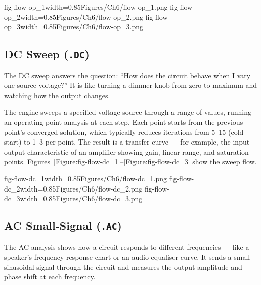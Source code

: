   {fig-flow-op_1}{width=0.85\textwidth}{Figures/Ch6/flow-op_1.png}
  {fig-flow-op_2}{width=0.85\textwidth}{Figures/Ch6/flow-op_2.png}
  {fig-flow-op_3}{width=0.85\textwidth}{Figures/Ch6/flow-op_3.png}

\subsection{DC Sweep (\texttt{.DC})}

The DC sweep answers the question: ``How does the circuit behave when I vary one source voltage?'' It is like turning a dimmer knob from zero to maximum and watching how the output changes.

The engine sweeps a specified voltage source through a range of values, running an operating-point analysis at each step. Each point starts from the previous point's converged solution, which typically reduces iterations from 5--15 (cold start) to 1--3 per point. The result is a transfer curve --- for example, the input-output characteristic of an amplifier showing gain, linear range, and saturation points. Figures~\ref{Figure:fig-flow-dc_1}--\ref{Figure:fig-flow-dc_3} show the sweep flow.

  {fig-flow-dc_1}{width=0.85\textwidth}{Figures/Ch6/flow-dc_1.png}
  {fig-flow-dc_2}{width=0.85\textwidth}{Figures/Ch6/flow-dc_2.png}
  {fig-flow-dc_3}{width=0.85\textwidth}{Figures/Ch6/flow-dc_3.png}

\subsection{AC Small-Signal (\texttt{.AC})}

The AC analysis shows how a circuit responds to different frequencies --- like a speaker's frequency response chart or an audio equaliser curve. It sends a small sinusoidal signal through the circuit and measures the output amplitude and phase shift at each frequency.

